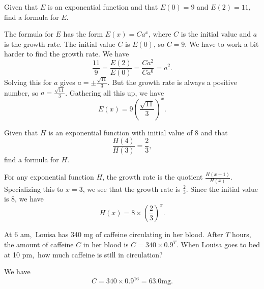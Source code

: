 \documentclass[12pt,fleqn,answers]{exam}
\newcommand\AM{{\sc am}}
\newcommand\PM{{\sc pm}}
\begin{document}
\begin{questions} 

\question [2] Given that $E$ is an exponential function and that $E(0)=9$
and $E(2) = 11$, find a formula for $E$.

\begin{solution}[2.5in] The formula for $E$ has the form $E(x) = C a^x$,
    where $C$ is the initial value and $a$ is the growth rate. The 
    initial value $C$ is $E(0)$, so $C = 9.$ We have to work a bit 
    harder to find the growth rate. We have
    \begin{equation*}
        \frac{11}{9} = \frac{E(2)}{E(0)} = \frac{C a^2}{C a^0} = a^2.
    \end{equation*}
    Solving this for $a$ gives $a = \pm \frac{\sqrt{11}}{3}$. But 
    the growth rate is always a positive number, so 
    $a = \frac{\sqrt{11}}{3}$. Gathering all this up, we have
    \begin{equation*}
        E(x) = 9 \left(  \frac{\sqrt{11}}{3} \right)^x.
    \end{equation*}

  \end{solution}

\question [2] Given that $H$ is an exponential function with
initial value of $8$ and that
\begin{equation*}
   \frac{H(4)}{H(3)} = \frac{2}{3},
\end{equation*}
find a formula for $H$.
\begin{solution}%
    For any exponential function $H$, the growth rate is the quotient
    $\frac{H(x+1)}{H(x)}$. Specializing this to $x=3$, we see that the
    growth rate is $\frac{2}{3}$. Since the initial value is $8$, we
    have
    \begin{equation*}
        H(x) = 8 \times \left(\frac{2}{3} \right)^x.
    \end{equation*}

\end{solution}
\vfill
\newpage

\question [2]  At 6 \AM,\, Louisa has 340 mg of caffeine circulating 
in her blood. After $T$ hours, the amount of caffeine $C$ in her blood is
\(
     C = 340  \times  0.9^T
\).
When Louisa goes to bed at 10 \PM,\, how much caffeine is
still in circulation?
\begin{solution}[1.5in] We have
    \begin{equation*}
        C = 340 \times 0.9^{16} = 63.0 \mbox{mg}.
    \end{equation*}


\end{solution}
\end{questions}
\end{document}
